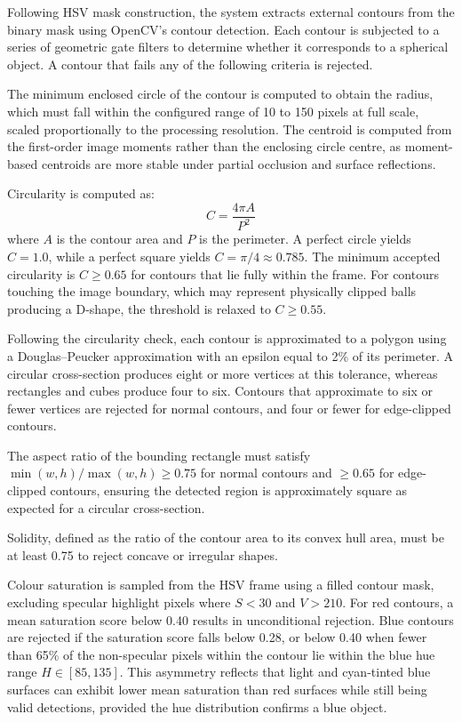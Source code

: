 
Following HSV mask construction, the system extracts external contours from the
binary mask using OpenCV's contour detection. Each contour is subjected to a
series of geometric gate filters to determine whether it corresponds to a spherical
object. A contour that fails any of the following criteria is rejected.

The minimum enclosed circle of the contour is computed to obtain the radius, which
must fall within the configured range of 10 to 150 pixels at full scale, scaled
proportionally to the processing resolution. The centroid is computed from the
first-order image moments rather than the enclosing circle centre, as moment-based
centroids are more stable under partial occlusion and surface reflections.

Circularity is computed as:
\begin{equation}
    C = \frac{4\pi A}{P^2}
\end{equation}
where $A$ is the contour area and $P$ is the perimeter. A perfect circle yields
$C = 1.0$, while a perfect square yields $C = \pi/4 \approx 0.785$. The minimum
accepted circularity is $C \geq 0.65$ for contours that lie fully within the frame.
For contours touching the image boundary, which may represent physically clipped
balls producing a D-shape, the threshold is relaxed to $C \geq 0.55$.

Following the circularity check, each contour is approximated to a polygon using a
Douglas--Peucker approximation with an epsilon equal to 2\% of its perimeter. A
circular cross-section produces eight or more vertices at this tolerance, whereas
rectangles and cubes produce four to six. Contours that approximate to six or fewer
vertices are rejected for normal contours, and four or fewer for edge-clipped
contours.

The aspect ratio of the bounding rectangle must satisfy
$\min(w,h)/\max(w,h) \geq 0.75$ for normal contours and $\geq 0.65$ for
edge-clipped contours, ensuring the detected region is approximately square as
expected for a circular cross-section.

Solidity, defined as the ratio of the contour area to its convex hull area, must
be at least 0.75 to reject concave or irregular shapes.

Colour saturation is sampled from the HSV frame using a filled contour mask,
excluding specular highlight pixels where $S < 30$ and $V > 210$. For red
contours, a mean saturation score below 0.40 results in unconditional rejection.
Blue contours are rejected if the saturation score falls below 0.28, or below
0.40 when fewer than 65\% of the non-specular pixels within the contour lie
within the blue hue range $H \in [85, 135]$. This asymmetry reflects that
light and cyan-tinted blue surfaces can exhibit lower mean saturation than red
surfaces while still being valid detections, provided the hue distribution
confirms a blue object.

